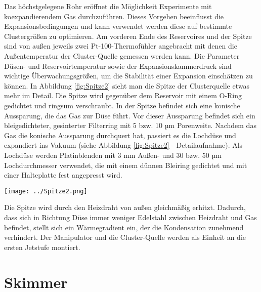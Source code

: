 Das höchstgelegene Rohr eröffnet die Möglichkeit Experimente mit koexpandierendem Gas durchzuführen. Dieses Vorgehen beeinflusst die Expansionsbedingungen und kann verwendet werden diese auf bestimmte Clustergrößen zu optimieren. Am vorderen Ende des Reservoires und der Spitze sind von außen jeweils zwei Pt-100-Thermofühler angebracht mit denen die Außentemperatur der Cluster-Quelle gemessen werden kann. Die Parameter Düsen- und Reservoirtemperatur sowie der Expansionskammerdruck sind wichtige Überwachungsgrößen, um die Stabilität einer Expansion einschätzen zu können. In Abbildung \ref{fig:Spitze2} sieht man die Spitze der Clusterquelle etwas mehr im Detail. Die Spitze wird gegenüber dem Reservoir mit einem O-Ring gedichtet und ringsum verschraubt. In der Spitze befindet sich eine konische Aussparung, die das Gas zur Düse führt. Vor dieser Aussparung befindet sich ein bleigedichteter, gesinterter Filterring mit 5 bzw. 10 µm Porenweite. Nachdem das Gas die konische Aussparung durchquert hat, passiert es die Lochdüse und expandiert ins Vakuum (siehe Abbildung \ref{fig:Spitze2} - Detailaufnahme). Als Lochdüse werden Platinblenden mit 3 mm Außen- und 30 bzw. 50 µm Lochdurchmesser verwendet, die mit einem dünnen Bleiring gedichtet und mit einer Halteplatte fest angepresst wird. %

\begin{center} 
\begin{minipage}{\linewidth}
\texttt{[image: ../Spitze2.png]}%
  \label{fig:Spitze2}
\end{minipage} 
\end{center} 

Die Spitze wird durch den Heizdraht von außen gleichmäßig erhitzt. Dadurch, dass sich in Richtung Düse immer weniger Edelstahl zwischen Heizdraht und Gas befindet, stellt sich ein Wärmegradient ein, der die Kondensation zunehmend verhindert.
%
Der Manipulator und die Cluster-Quelle werden als Einheit an die ersten Jetstufe montiert. \\

%
%



\section{Skimmer} \label{sec:Skimmer}


